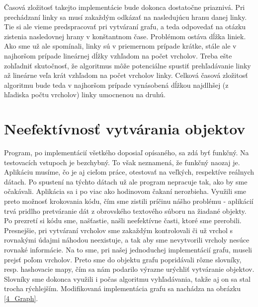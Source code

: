 Časová zložitosť takejto implementácie bude dokonca dostatočne priaznivá. Pri prechádzaní linky sa musí zakaždým odkázať na nasledujúcu hranu danej linky. Tie si ale vieme predspracovať pri vytváraní grafu, a teda odpovedať na otázku zistenia nasledovnej hrany v konštantnom čase. Problémom ostáva dĺžka liniek. Ako sme už ale spomínali, linky sú v priemernom prípade krátke, stále ale v najhoršom prípade lineárnej dĺžky vzhľadom na počet vrcholov. Treba ešte zohľadniť skutočnosť, že algoritmus môže potenciálne spustiť prehľadávanie linky až lineárne veľa krát vzhľadom na počet vrcholov linky. Celková časová zložitosť algoritmu bude teda v najhoršom prípade vynásobená dĺžkou najdlhšej (z hľadiska počtu vrcholov) linky umocnenou na druhú.\newline


\section{Neefektívnosť vytvárania objektov}

Program, po implementácií všetkého doposiaľ opísaného, sa zdá byť funkčný. Na testovacích vstupoch je bezchybný. To však neznamená, že funkčný naozaj je. Aplikáciu musíme, čo je aj cieľom práce, otestovať na veľkých, respektíve reálnych dátach. Po spustení na týchto dátach už ale program nepracuje tak, ako by sme očakávali. Aplikácia sa i po viac ako hodinovom čakaní nerozbieha. Využili sme preto možnosť krokovania kódu, čím sme zistili príčinu nášho problému - aplikácií trvá pridlho pretváranie dát z obrovského textového súboru na žiadané objekty. Po prezretí si kódu sme, našťastie, našli neefektívne časti, ktoré sme prerobili. Presnejšie, pri vytváraní vrcholov sme zakaždým kontrolovali či už vrchol s rovnakými údajmi náhodou neexistuje, a tak aby sme nevytvorili vrcholy nesúce rovnaké informácie. Na to sme, pri našej jednoduchej implementácií grafu, museli prejsť poľom vrcholov. Preto sme do objektu grafu popridávali rôzne slovníky, resp. hashovacie mapy, čím sa nám podarilo výrazne urýchliť vytváranie objektov. Slovníky sme dokonca využili i počas algoritmu vyhľadávania, takže aj on sa stal trocha rýchlejším. Modifikovaná implementácia grafu sa nachádza na obrázku \ref{4_Graph}.\newline

